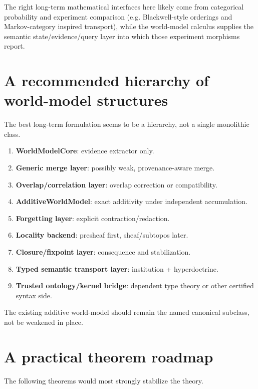 \documentclass[11pt]{article}
\begin{document}
The right long-term mathematical interfaces here likely come from categorical
probability and experiment comparison (e.g. Blackwell-style orderings and
Markov-category inspired transport), while the world-model calculus supplies the
semantic state/evidence/query layer into which those experiment morphisms
report.

\section{A recommended hierarchy of world-model structures}

The best long-term formulation seems to be a hierarchy, not a single monolithic
class.

\begin{enumerate}
  \item \textbf{WorldModelCore}: evidence extractor only.
  \item \textbf{Generic merge layer}: possibly weak, provenance-aware merge.
  \item \textbf{Overlap/correlation layer}: overlap correction or compatibility.
  \item \textbf{AdditiveWorldModel}: exact additivity under independent
        accumulation.
  \item \textbf{Forgetting layer}: explicit contraction/redaction.
  \item \textbf{Locality backend}: presheaf first, sheaf/subtopos later.
  \item \textbf{Closure/fixpoint layer}: consequence and stabilization.
  \item \textbf{Typed semantic transport layer}: institution + hyperdoctrine.
  \item \textbf{Trusted ontology/kernel bridge}: dependent type theory or other
        certified syntax side.
\end{enumerate}

The existing additive world-model should remain the named canonical subclass,
not be weakened in place.

\section{A practical theorem roadmap}

The following theorems would most strongly stabilize the theory.
\end{document}
